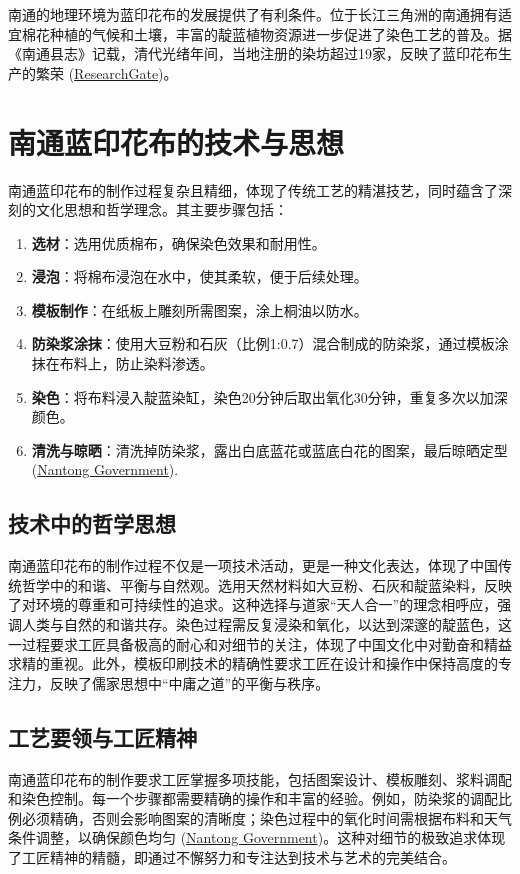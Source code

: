 \documentclass[12pt]{article}
\begin{document}
南通的地理环境为蓝印花布的发展提供了有利条件。位于长江三角洲的南通拥有适宜棉花种植的气候和土壤，丰富的靛蓝植物资源进一步促进了染色工艺的普及。据《南通县志》记载，清代光绪年间，当地注册的染坊超过19家，反映了蓝印花布生产的繁荣 (\href{https://www.researchgate.net/publication/315870915_Study_on_the_Origin_of_Nantong_Blue_Calico}{ResearchGate})。

\section{南通蓝印花布的技术与思想}
南通蓝印花布的制作过程复杂且精细，体现了传统工艺的精湛技艺，同时蕴含了深刻的文化思想和哲学理念。其主要步骤包括：

\begin{enumerate}
    \item \textbf{选材}：选用优质棉布，确保染色效果和耐用性。
    \item \textbf{浸泡}：将棉布浸泡在水中，使其柔软，便于后续处理。
    \item \textbf{模板制作}：在纸板上雕刻所需图案，涂上桐油以防水。
    \item \textbf{防染浆涂抹}：使用大豆粉和石灰（比例1:0.7）混合制成的防染浆，通过模板涂抹在布料上，防止染料渗透。
    \item \textbf{染色}：将布料浸入靛蓝染缸，染色20分钟后取出氧化30分钟，重复多次以加深颜色。
    \item \textbf{清洗与晾晒}：清洗掉防染浆，露出白底蓝花或蓝底白花的图案，最后晾晒定型 (\href{http://en.nantong.gov.cn/2018-08/07/c_260693.htm}{Nantong Government}).
\end{enumerate}

\subsection{技术中的哲学思想}
南通蓝印花布的制作过程不仅是一项技术活动，更是一种文化表达，体现了中国传统哲学中的和谐、平衡与自然观。选用天然材料如大豆粉、石灰和靛蓝染料，反映了对环境的尊重和可持续性的追求。这种选择与道家“天人合一”的理念相呼应，强调人类与自然的和谐共存。染色过程需反复浸染和氧化，以达到深邃的靛蓝色，这一过程要求工匠具备极高的耐心和对细节的关注，体现了中国文化中对勤奋和精益求精的重视。此外，模板印刷技术的精确性要求工匠在设计和操作中保持高度的专注力，反映了儒家思想中“中庸之道”的平衡与秩序。

\subsection{工艺要领与工匠精神}
南通蓝印花布的制作要求工匠掌握多项技能，包括图案设计、模板雕刻、浆料调配和染色控制。每一个步骤都需要精确的操作和丰富的经验。例如，防染浆的调配比例必须精确，否则会影响图案的清晰度；染色过程中的氧化时间需根据布料和天气条件调整，以确保颜色均匀 (\href{http://en.nantong.gov.cn/2018-08/07/c_260693.htm}{Nantong Government})。这种对细节的极致追求体现了工匠精神的精髓，即通过不懈努力和专注达到技术与艺术的完美结合。
\end{document}
